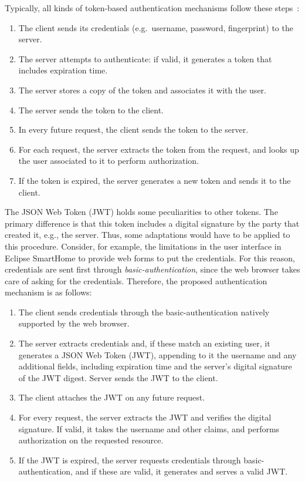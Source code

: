 \documentclass[12pt]{article}
\begin{document}
Typically, all kinds of token-based authentication mechanisms follow these steps~\cite{token_auth}:
\begin{enumerate}
\item The client sends its credentials (e.g.\ username, password, fingerprint) to the server.
\item The server attempts to authenticate: if valid, it generates a token that includes expiration time.
\item The server stores a copy of the token and associates it with the user.
\item The server sends the token to the client.
\item In every future request, the client sends the token to the server.
\item For each request, the server extracts the token from the request, and looks up the user associated to it to perform authorization.
\item If the token is expired, the server generates a new token and sends it to the client. 
\end{enumerate}

The JSON Web Token (JWT) holds some peculiarities to other tokens. The primary difference is that this token includes a digital signature by the party that created it, e.g., the server. Thus, some adaptations would have to be applied to this procedure. Consider, for example, the limitations in the user interface in Eclipse SmartHome to provide web forms to put the credentials. For this reason, credentials are sent first through \emph{basic-authentication}, since the web browser takes care of asking for the credentials. Therefore, the proposed authentication mechanism is as follows:

\begin{enumerate}
\item The client sends credentials through the basic-authentication natively supported by the web browser.
\item The server extracts credentials and, if these match an existing user, it generates a JSON Web Token (JWT), appending to it the username and any additional fields, including expiration time and the server's digital signature of the JWT digest. Server sends the JWT to the client.
\item The client attaches the JWT on any future request.
\item For every request, the server extracts the JWT and verifies the digital signature. If valid, it takes the username and other claims, and performs authorization on the requested resource.
\item If the JWT is expired, the server requests credentials through basic-authentication, and if these are valid, it generates and serves a valid JWT.
\end{enumerate}
\end{document}
